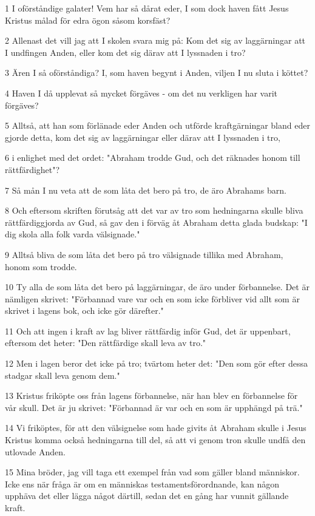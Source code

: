 \par 1 I oförståndige galater! Vem har så dårat eder, I som dock haven fått Jesus Kristus målad för edra ögon såsom korsfäst?
\par 2 Allenast det vill jag att I skolen svara mig på: Kom det sig av laggärningar att I undfingen Anden, eller kom det sig därav att I lyssnaden i tro?
\par 3 Ären I så oförståndiga? I, som haven begynt i Anden, viljen I nu sluta i köttet?
\par 4 Haven I då upplevat så mycket förgäves - om det nu verkligen har varit förgäves?
\par 5 Alltså, att han som förlänade eder Anden och utförde kraftgärningar bland eder gjorde detta, kom det sig av laggärningar eller därav att I lyssnaden i tro,
\par 6 i enlighet med det ordet: "Abraham trodde Gud, och det räknades honom till rättfärdighet"?
\par 7 Så mån I nu veta att de som låta det bero på tro, de äro Abrahams barn.
\par 8 Och eftersom skriften förutsåg att det var av tro som hedningarna skulle bliva rättfärdiggjorda av Gud, så gav den i förväg åt Abraham detta glada budskap: "I dig skola alla folk varda välsignade."
\par 9 Alltså bliva de som låta det bero på tro välsignade tillika med Abraham, honom som trodde.
\par 10 Ty alla de som låta det bero på laggärningar, de äro under förbannelse. Det är nämligen skrivet: "Förbannad vare var och en som icke förbliver vid allt som är skrivet i lagens bok, och icke gör därefter."
\par 11 Och att ingen i kraft av lag bliver rättfärdig inför Gud, det är uppenbart, eftersom det heter: "Den rättfärdige skall leva av tro."
\par 12 Men i lagen beror det icke på tro; tvärtom heter det: "Den som gör efter dessa stadgar skall leva genom dem."
\par 13 Kristus friköpte oss från lagens förbannelse, när han blev en förbannelse för vår skull. Det är ju skrivet: "Förbannad är var och en som är upphängd på trä."
\par 14 Vi friköptes, för att den välsignelse som hade givits åt Abraham skulle i Jesus Kristus komma också hedningarna till del, så att vi genom tron skulle undfå den utlovade Anden.
\par 15 Mina bröder, jag vill taga ett exempel från vad som gäller bland människor. Icke ens när fråga är om en människas testamentsförordnande, kan någon upphäva det eller lägga något därtill, sedan det en gång har vunnit gällande kraft.
